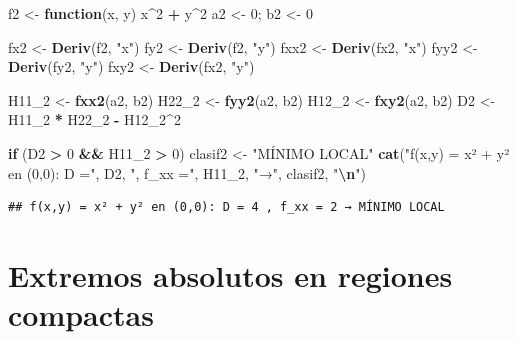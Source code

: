 \documentclass[
]{book}
\newenvironment{Shaded}{\begin{snugshade}}{\end{snugshade}}
\newcommand{\ControlFlowTok}[1]{\textcolor[rgb]{0.13,0.29,0.53}{\textbf{#1}}}
\newcommand{\DecValTok}[1]{\textcolor[rgb]{0.00,0.00,0.81}{#1}}
\newcommand{\FunctionTok}[1]{\textcolor[rgb]{0.13,0.29,0.53}{\textbf{#1}}}
\newcommand{\NormalTok}[1]{#1}
\newcommand{\OtherTok}[1]{\textcolor[rgb]{0.56,0.35,0.01}{#1}}
\newcommand{\SpecialCharTok}[1]{\textcolor[rgb]{0.81,0.36,0.00}{\textbf{#1}}}
\newcommand{\StringTok}[1]{\textcolor[rgb]{0.31,0.60,0.02}{#1}}
\begin{document}
\begin{Shaded}
\begin{Highlighting}[]
\NormalTok{f2 }\OtherTok{\textless{}{-}} \ControlFlowTok{function}\NormalTok{(x, y) x}\SpecialCharTok{\^{}}\DecValTok{2} \SpecialCharTok{+}\NormalTok{ y}\SpecialCharTok{\^{}}\DecValTok{2}
\NormalTok{a2 }\OtherTok{\textless{}{-}} \DecValTok{0}\NormalTok{; b2 }\OtherTok{\textless{}{-}} \DecValTok{0}

\NormalTok{fx2 }\OtherTok{\textless{}{-}} \FunctionTok{Deriv}\NormalTok{(f2, }\StringTok{"x"}\NormalTok{)}
\NormalTok{fy2 }\OtherTok{\textless{}{-}} \FunctionTok{Deriv}\NormalTok{(f2, }\StringTok{"y"}\NormalTok{)}
\NormalTok{fxx2 }\OtherTok{\textless{}{-}} \FunctionTok{Deriv}\NormalTok{(fx2, }\StringTok{"x"}\NormalTok{)}
\NormalTok{fyy2 }\OtherTok{\textless{}{-}} \FunctionTok{Deriv}\NormalTok{(fy2, }\StringTok{"y"}\NormalTok{)}
\NormalTok{fxy2 }\OtherTok{\textless{}{-}} \FunctionTok{Deriv}\NormalTok{(fx2, }\StringTok{"y"}\NormalTok{)}

\NormalTok{H11\_2 }\OtherTok{\textless{}{-}} \FunctionTok{fxx2}\NormalTok{(a2, b2)}
\NormalTok{H22\_2 }\OtherTok{\textless{}{-}} \FunctionTok{fyy2}\NormalTok{(a2, b2)}
\NormalTok{H12\_2 }\OtherTok{\textless{}{-}} \FunctionTok{fxy2}\NormalTok{(a2, b2)}
\NormalTok{D2 }\OtherTok{\textless{}{-}}\NormalTok{ H11\_2 }\SpecialCharTok{*}\NormalTok{ H22\_2 }\SpecialCharTok{{-}}\NormalTok{ H12\_2}\SpecialCharTok{\^{}}\DecValTok{2}

\ControlFlowTok{if}\NormalTok{ (D2 }\SpecialCharTok{\textgreater{}} \DecValTok{0} \SpecialCharTok{\&\&}\NormalTok{ H11\_2 }\SpecialCharTok{\textgreater{}} \DecValTok{0}\NormalTok{) clasif2 }\OtherTok{\textless{}{-}} \StringTok{"MÍNIMO LOCAL"}
\FunctionTok{cat}\NormalTok{(}\StringTok{"f(x,y) = x² + y² en (0,0): D ="}\NormalTok{, D2, }\StringTok{", f\_xx ="}\NormalTok{, H11\_2, }\StringTok{"→"}\NormalTok{, clasif2, }\StringTok{"}\SpecialCharTok{\textbackslash{}n}\StringTok{"}\NormalTok{)}
\end{Highlighting}
\end{Shaded}

\begin{verbatim}
## f(x,y) = x² + y² en (0,0): D = 4 , f_xx = 2 → MÍNIMO LOCAL
\end{verbatim}

\section{Extremos absolutos en regiones compactas}\label{extremos-absolutos-en-regiones-compactas}
\end{document}
